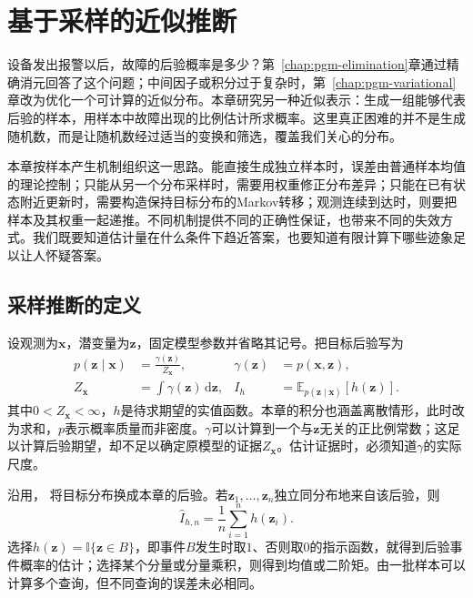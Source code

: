 \chapter{基于采样的近似推断}
\label{chap:pgm-sampling}

设备发出报警以后，故障的后验概率是多少？第~\ref{chap:pgm-elimination}章通过精确消元回答了这个问题；中间因子或积分过于复杂时，第~\ref{chap:pgm-variational}章改为优化一个可计算的近似分布。本章研究另一种近似表示：生成一组能够代表后验的样本，用样本中故障出现的比例估计所求概率。这里真正困难的并不是生成随机数，而是让随机数经过适当的变换和筛选，覆盖我们关心的分布。

本章按样本产生机制组织这一思路。能直接生成独立样本时，误差由普通样本均值的理论控制；只能从另一个分布采样时，需要用权重修正分布差异；只能在已有状态附近更新时，需要构造保持目标分布的Markov转移；观测连续到达时，则要把样本及其权重一起递推。不同机制提供不同的正确性保证，也带来不同的失效方式。我们既要知道估计量在什么条件下趋近答案，也要知道有限计算下哪些迹象足以让人怀疑答案。

\section{采样推断的定义}
\label{sec:pgm-sampling-definition}

设观测为$\bm{x}$，潜变量为$\bm{z}$，固定模型参数并省略其记号。把目标后验写为
\begin{equation}
  \begin{aligned}
    p(\bm{z}\mid\bm{x})&=\frac{\gamma(\bm{z})}{Z_{\bm{x}}},&
    \gamma(\bm{z})&=p(\bm{x},\bm{z}),\\
    Z_{\bm{x}}&=\int\gamma(\bm{z})\,\mathrm{d}\bm{z},&
    I_h&=\mathbb{E}_{p(\bm{z}\mid\bm{x})}[h(\bm{z})].
  \end{aligned}
  \label{eq:pgm-sampling-target}
\end{equation}
其中$0<Z_{\bm{x}}<\infty$，$h$是待求期望的实值函数。本章的积分也涵盖离散情形，此时改为求和，$p$表示概率质量而非密度。$\gamma$可以计算到一个与$\bm{z}$无关的正比例常数；这足以计算后验期望，却不足以确定原模型的证据$Z_{\bm{x}}$。估计证据时，必须知道$\gamma$的实际尺度。

沿用，
将目标分布换成本章的后验。若$\bm{z}_1,\ldots,\bm{z}_n$独立同分布地来自该后验，则
\begin{equation}
  \widehat I_{h,n}=\frac{1}{n}\sum_{i=1}^{n}h(\bm{z}_i).
  \label{eq:pgm-sampling-direct-estimator}
\end{equation}
选择$h(\bm{z})=\mathbb{I}\{\bm{z}\in B\}$，即事件$B$发生时取$1$、否则取$0$的指示函数，就得到后验事件概率的估计；选择某个分量或分量乘积，则得到均值或二阶矩。由一批样本可以计算多个查询，但不同查询的误差未必相同。

